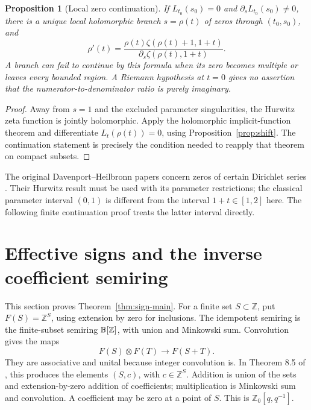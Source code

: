 \documentclass[11pt]{article}
\newcommand{\Z}{\mathbb Z}\newcommand{\N}{\mathbb N}\newcommand{\Q}{\mathbb Q}
\newtheorem{proposition}[theorem]{Proposition}
\theoremstyle{definition}\newtheorem{definition}[theorem]{Definition}
\begin{document}


\begin{proposition}[Local zero continuation]\label{prop:zero-ode}
If $L_{t_0}(s_0)=0$ and $\partial_sL_{t_0}(s_0)\ne0$, there is a unique local holomorphic branch $s=\rho(t)$ of zeros through $(t_0,s_0)$, and
\[
 \rho'(t)=\frac{\rho(t)\zeta(\rho(t)+1,1+t)}
                         {\partial_s\zeta(\rho(t),1+t)}.
\]
A branch can fail to continue by this formula when its zero becomes multiple or leaves every bounded region. A Riemann hypothesis at $t=0$ gives no assertion that the numerator-to-denominator ratio is purely imaginary.
\end{proposition}
\begin{proof}
Away from $s=1$ and the excluded parameter singularities, the Hurwitz zeta function is jointly holomorphic. Apply the holomorphic implicit-function theorem and differentiate $L_t(\rho(t))=0$, using Proposition~\ref{prop:shift}. The continuation statement is precisely the condition needed to reapply that theorem on compact subsets.
\end{proof}




The original Davenport--Heilbronn papers concern zeros of certain Dirichlet series \citep{DH1,DH2}. Their Hurwitz result must be used with its parameter restrictions; the classical parameter interval $(0,1)$ is different from the interval $1+t\in[1,2]$ here. The following finite continuation proof treats the latter interval directly.







\section{Effective signs and the inverse coefficient semiring}\label{sec:coefficient}
This section proves Theorem~\ref{thm:sign-main}. For a finite set $S\subset\Z$, put $F(S)=\Z^S$, using extension by zero for inclusions. The idempotent semiring is the finite-subset semiring $\B[\Z]$, with union and Minkowski sum. Convolution gives the maps
\[
 F(S)\otimes F(T)\longrightarrow F(S+T).
\]
They are associative and unital because integer convolution is. In Theorem 8.5 of \citet{CFMM}, this produces the elements $(S,c)$, with $c\in\Z^S$. Addition is union of the sets and extension-by-zero addition of coefficients; multiplication is Minkowski sum and convolution. A coefficient may be zero at a point of $S$. This is $\Z_0[q,q^{-1}]$.
\end{document}
